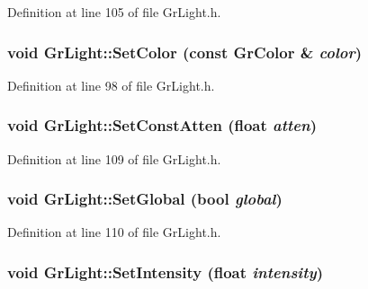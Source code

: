 Definition at line 105 of file GrLight.h.\hypertarget{class_gr_light_f6585ac78a0365a4b65e58d3d806794b}{
\subsubsection[{SetColor}]{\setlength{\rightskip}{0pt plus 5cm}void GrLight::SetColor (const {\bf GrColor} \& {\em color})}}
\label{class_gr_light_f6585ac78a0365a4b65e58d3d806794b}




Definition at line 98 of file GrLight.h.\hypertarget{class_gr_light_98f2b78251ec1358a262846b838c3d42}{
\subsubsection[{SetConstAtten}]{\setlength{\rightskip}{0pt plus 5cm}void GrLight::SetConstAtten (float {\em atten})}}
\label{class_gr_light_98f2b78251ec1358a262846b838c3d42}




Definition at line 109 of file GrLight.h.\hypertarget{class_gr_light_b057e347b0e89b3d0e378c8cfd4ea8fb}{
\subsubsection[{SetGlobal}]{\setlength{\rightskip}{0pt plus 5cm}void GrLight::SetGlobal (bool {\em global})}}
\label{class_gr_light_b057e347b0e89b3d0e378c8cfd4ea8fb}




Definition at line 110 of file GrLight.h.\hypertarget{class_gr_light_2bc38d15e8a634268056817102ed4df0}{
\subsubsection[{SetIntensity}]{\setlength{\rightskip}{0pt plus 5cm}void GrLight::SetIntensity (float {\em intensity})}}
\label{class_gr_light_2bc38d15e8a634268056817102ed4df0}




